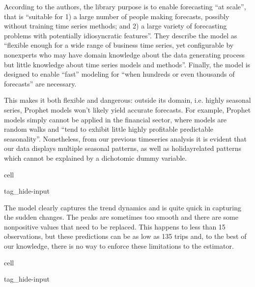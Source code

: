 \documentclass[letterpaper,10pt,english]{jupyterBook}
\begin{document}
\sphinxAtStartPar
According to the authors, the library purpose is to enable forecasting “at scale”, that is “suitable  for  1)  a  large  number  of  people  making  forecasts,  possibly  without  training  time  series  methods;  and  2)  a  large  variety  of  forecasting  problems  with  potentially idiosyncratic features”. They describe the model as “flexible enough for  a  wide  range  of  business  time  series,  yet  configurable  by  non\sphinxhyphen{}experts  who  may  have domain knowledge about the data generating process but little knowledge about time series models and methods”. Finally, the model is designed to enable “fast” modeling for “when hundreds or even thousands of forecasts” are necessary.

\sphinxAtStartPar
This makes it both flexible and dangerous: outside its domain, i.e. highly seasonal series, Prophet models won’t likely yield accurate forecasts. For example, Prophet models simply cannot be applied in the financial sector, where models are random walks and “tend to exhibit little highly profitable predictable seasonality”. Nonetheless, from our previous time\sphinxhyphen{}series analysis it is evident that our data displays multiple seasonal patterns, as well as holiday\sphinxhyphen{}related patterns which cannot be explained by a dichotomic dummy variable.

\begin{sphinxuseclass}{cell}
\begin{sphinxuseclass}{tag_hide-input}
\end{sphinxuseclass}
\end{sphinxuseclass}
\sphinxAtStartPar
The model clearly captures the trend dynamics and is quite quick in capturing the sudden changes. The peaks are sometimes too smooth and there are some non\sphinxhyphen{}positive values that need to be replaced. This happens to less than 15 observations, but these predictions can be as low as \sphinxhyphen{}135 trips and, to the best of our knowledge, there is no way to enforce these limitations to the estimator.

\begin{sphinxuseclass}{cell}
\begin{sphinxuseclass}{tag_hide-input}
\end{sphinxuseclass}
\end{sphinxuseclass}
\end{document}
